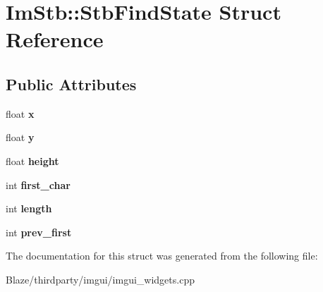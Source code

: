 \hypertarget{structImStb_1_1StbFindState}{}\section{Im\+Stb\+:\+:Stb\+Find\+State Struct Reference}
\label{structImStb_1_1StbFindState}
\subsection*{Public Attributes}
\begin{DoxyCompactItemize}
\item 
\mbox{\label{structImStb_1_1StbFindState_a2233226b708f6673b179494a73cfca3d}} 
float {\bfseries x}
\item 
\mbox{\label{structImStb_1_1StbFindState_a7e9bfd008e13aae14cd9cfc7cf9436d1}} 
float {\bfseries y}
\item 
\mbox{\label{structImStb_1_1StbFindState_ac11400edb330bb6170922acf04649798}} 
float {\bfseries height}
\item 
\mbox{\label{structImStb_1_1StbFindState_a247e22da771844f21e43be8c06dc8069}} 
int {\bfseries first\+\_\+char}
\item 
\mbox{\label{structImStb_1_1StbFindState_ad5660b469b14d6c8b63bb70af2a4e9eb}} 
int {\bfseries length}
\item 
\mbox{\label{structImStb_1_1StbFindState_afd38f31789989cf51f7b6bc358009d15}} 
int {\bfseries prev\+\_\+first}
\end{DoxyCompactItemize}


The documentation for this struct was generated from the following file\+:\begin{DoxyCompactItemize}
\item 
Blaze/thirdparty/imgui/imgui\+\_\+widgets.\+cpp\end{DoxyCompactItemize}
